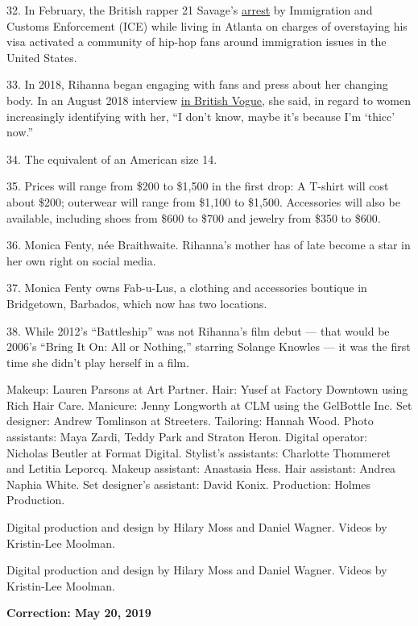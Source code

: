 32. In February, the British rapper 21 Savage's
\href{https://www.nytimes3xbfgragh.onion/2019/02/03/arts/21-savage-arrest-ice-uk.html}{arrest}
by Immigration and Customs Enforcement (ICE) while living in Atlanta on
charges of overstaying his visa activated a community of hip-hop fans
around immigration issues in the United States.

33. In 2018, Rihanna began engaging with fans and press about her
changing body. In an August 2018 interview
\href{https://www.vogue.co.uk/article/rihanna-september-cover-british-vogue-2018}{in
British Vogue}, she said, in regard to women increasingly identifying
with her, ``I don't know, maybe it's because I'm `thicc' now.''

34. The equivalent of an American size 14.

35. Prices will range from \$200 to \$1,500 in the first drop: A T-shirt
will cost about \$200; outerwear will range from \$1,100 to \$1,500.
Accessories will also be available, including shoes from \$600 to \$700
and jewelry from \$350 to \$600.

36. Monica Fenty, née Braithwaite. Rihanna's mother has of late become a
star in her own right on social media.

37. Monica Fenty owns Fab-u-Lus, a clothing and accessories boutique in
Bridgetown, Barbados, which now has two locations.

38. While 2012's ``Battleship'' was not Rihanna's film debut --- that
would be 2006's ``Bring It On: All or Nothing,'' starring Solange
Knowles --- it was the first time she didn't play herself in a film.

Makeup: Lauren Parsons at Art Partner. Hair: Yusef at Factory Downtown
using Rich Hair Care. Manicure: Jenny Longworth at CLM using the
GelBottle Inc. Set designer: Andrew Tomlinson at Streeters. Tailoring:
Hannah Wood. Photo assistants: Maya Zardi, Teddy Park and Straton Heron.
Digital operator: Nicholas Beutler at Format Digital. Stylist's
assistants: Charlotte Thommeret and Letitia Leporcq. Makeup assistant:
Anastasia Hess. Hair assistant: Andrea Naphia White. Set designer's
assistant: David Konix. Production: Holmes Production.

Digital production and design by Hilary Moss and Daniel Wagner. Videos
by Kristin-Lee Moolman.

Digital production and design by Hilary Moss and Daniel Wagner. Videos
by Kristin-Lee Moolman.

\textbf{Correction: May 20, 2019}

